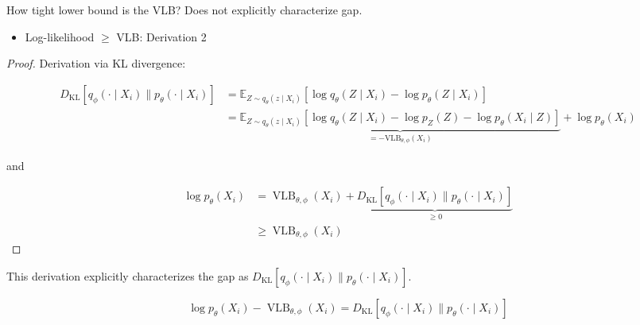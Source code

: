 \begin{frame}[allowframebreaks]
\begin{myconceptblock}{11.14}{How tight lower bound is the VLB?}
    Does not explicitly characterize gap.

    \par\noindent\textcolor{gray}{\hdashrule{\textwidth}{0.4pt}{1pt 2pt}}

    \begin{itemize}
        \item Log-likelihood $\geq$ VLB: Derivation 2
    \end{itemize}

    \begin{proof}
        Derivation via KL divergence:

        $$
        \begin{aligned}
        D_{\mathrm{KL}}\left[q_{\phi}\left(\cdot \mid X_{i}\right) \| p_{\theta}\left(\cdot \mid X_{i}\right)\right] & =\mathbb{E}_{Z \sim q_{\theta}\left(z \mid X_{i}\right)}\left[\log q_{\theta}\left(Z \mid X_{i}\right)-\log p_{\theta}\left(Z \mid X_{i}\right)\right] \\
        & =\underbrace{\mathbb{E}_{Z \sim q_{\theta}\left(z \mid X_{i}\right)}\left[\log q_{\theta}\left(Z \mid X_{i}\right)-\log p_{Z}(Z)-\log p_{\theta}\left(X_{i} \mid Z\right)\right]}_{=-\mathrm{VLB}_{\theta, \phi}\left(X_{i}\right)}+\log p_{\theta}\left(X_{i}\right)
        \end{aligned}
        $$

        and

        $$
        \begin{aligned}
        \log p_{\theta}\left(X_{i}\right) &= \operatorname{VLB}_{\theta, \phi}\left(X_{i}\right)+\underbrace{D_{\mathrm{KL}}\left[q_{\phi}\left(\cdot \mid X_{i}\right) \| p_{\theta}\left(\cdot \mid X_{i}\right)\right]}_{\geq 0} \\
        & \geq \operatorname{VLB}_{\theta, \phi}\left(X_{i}\right)
        \end{aligned}
        $$
    \end{proof}

    This derivation explicitly characterizes the gap as $D_{\mathrm{KL}}\left[q_{\phi}\left(\cdot \mid X_{i}\right) \| p_{\theta}\left(\cdot \mid X_{i}\right)\right]$.

    $$
    \log p_{\theta}\left(X_{i}\right) - \operatorname{VLB}_{\theta, \phi}\left(X_{i}\right) = D_{\mathrm{KL}}\left[q_{\phi}\left(\cdot \mid X_{i}\right) \| p_{\theta}\left(\cdot \mid X_{i}\right)\right]
    $$
\end{myconceptblock}

\end{frame}

